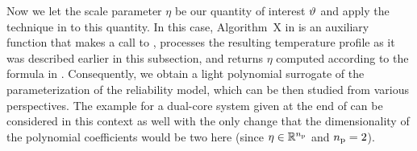 Now we let the scale parameter $\eta$ be our quantity of interest $\vartheta$ and apply the technique in  to this quantity.
In this case, Algorithm~X in  is an auxiliary function that makes a call to , processes the resulting temperature profile as it was described earlier in this subsection, and returns $\eta$ computed according to the formula in .
Consequently, we obtain a light polynomial surrogate of the parameterization of the reliability model, which can be then studied from various perspectives.
The example for a dual-core system given at the end of  can be considered in this context as well with the only change that the dimensionality of the polynomial coefficients would be two here (since $\eta \in \mathbb{R}^{n_\text{p}}$ and ${n_\text{p}} = 2$).
